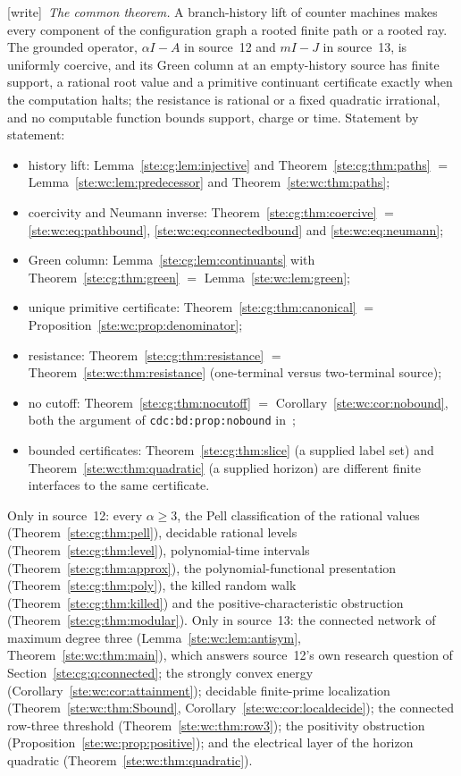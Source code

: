 \documentclass[11pt,letterpaper]{article}
\theoremstyle{definition}
\theoremstyle{remark}
\newcommand{\wtag}{\textup{[write]}}
\begin{document}
\wtag\ \emph{The common theorem.} A branch-history lift of counter machines makes every component of the configuration graph a rooted finite path or a rooted ray. The grounded operator, $\alpha I-A$ in source~12 and $mI-J$ in source~13, is uniformly coercive, and its Green column at an empty-history source has finite support, a rational root value and a primitive continuant certificate exactly when the computation halts; the resistance is rational or a fixed quadratic irrational, and no computable function bounds support, charge or time. Statement by statement:
\begin{itemize}
\item history lift: Lemma~\ref{ste:cg:lem:injective} and Theorem~\ref{ste:cg:thm:paths} $=$ Lemma~\ref{ste:wc:lem:predecessor} and Theorem~\ref{ste:wc:thm:paths};
\item coercivity and Neumann inverse: Theorem~\ref{ste:cg:thm:coercive} $=$ \eqref{ste:wc:eq:pathbound}, \eqref{ste:wc:eq:connectedbound} and \eqref{ste:wc:eq:neumann};
\item Green column: Lemma~\ref{ste:cg:lem:continuants} with Theorem~\ref{ste:cg:thm:green} $=$ Lemma~\ref{ste:wc:lem:green};
\item unique primitive certificate: Theorem~\ref{ste:cg:thm:canonical} $=$ Proposition~\ref{ste:wc:prop:denominator};
\item resistance: Theorem~\ref{ste:cg:thm:resistance} $=$ Theorem~\ref{ste:wc:thm:resistance} (one-terminal versus two-terminal source);
\item no cutoff: Theorem~\ref{ste:cg:thm:nocutoff} $=$ Corollary~\ref{ste:wc:cor:nobound}, both the argument of \texttt{cdc:bd:prop:nobound} in~\cite{cdc};
\item bounded certificates: Theorem~\ref{ste:cg:thm:slice} (a supplied label set) and Theorem~\ref{ste:wc:thm:quadratic} (a supplied horizon) are different finite interfaces to the same certificate.
\end{itemize}
Only in source~12: every $\alpha\geq3$, the Pell classification of the rational values (Theorem~\ref{ste:cg:thm:pell}), decidable rational levels (Theorem~\ref{ste:cg:thm:level}), polynomial-time intervals (Theorem~\ref{ste:cg:thm:approx}), the polynomial-functional presentation (Theorem~\ref{ste:cg:thm:poly}), the killed random walk (Theorem~\ref{ste:cg:thm:killed}) and the positive-characteristic obstruction (Theorem~\ref{ste:cg:thm:modular}). Only in source~13: the connected network of maximum degree three (Lemma~\ref{ste:wc:lem:antisym}, Theorem~\ref{ste:wc:thm:main}), which answers source~12's own research question of Section~\ref{ste:cg:q:connected}; the strongly convex energy (Corollary~\ref{ste:wc:cor:attainment}); decidable finite-prime localization (Theorem~\ref{ste:wc:thm:Sbound}, Corollary~\ref{ste:wc:cor:localdecide}); the connected row-three threshold (Theorem~\ref{ste:wc:thm:row3}); the positivity obstruction (Proposition~\ref{ste:wc:prop:positive}); and the electrical layer of the horizon quadratic (Theorem~\ref{ste:wc:thm:quadratic}).
\end{document}
